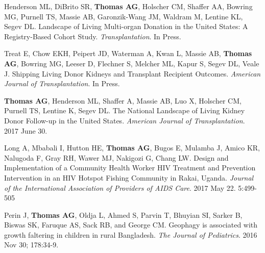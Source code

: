 \documentclass[10pt]{article}
\begin{document}
\begin{bibenum}


\item Henderson ML, DiBrito SR, \textbf{Thomas AG}, Holscher CM,
  Shaffer AA, Bowring MG, Purnell TS, Massie AB, Garonzik-Wang JM,
  Waldram M, Lentine KL, Segev DL.  Landscape of Living Multi-organ
  Donation in the United States: A Registry-Based Cohort Study.
  \emph{Transplantation}. In Press.

\item Treat E, Chow EKH, Peipert JD, Waterman A, Kwan L, Massie AB,
  \textbf{Thomas AG}, Bowring MG, Leeser D, Flechner S, Melcher ML, Kapur S,
  Segev DL, Veale J. Shipping Living Donor Kidneys and Transplant Recipient
  Outcomes.
  \emph{American Journal of Transplantation}. In Press.

\item \textbf{Thomas AG}, Henderson ML, Shaffer A, Massie AB, Luo X,
  Holscher CM, Purnell TS, Lentine K, Segev DL. The National Landscape
  of Living Kidney Donor Follow-up in the United States.
  \emph{American Journal of Transplantation}. 2017 June 30.

\item Long A, Mbabali I, Hutton HE, \textbf{Thomas AG}, Bugos E,
  Mulamba J, Amico KR, Nalugoda F, Gray RH,
  Wawer MJ, Nakigozi G, Chang LW.
  Design and Implementation of a Community Health Worker HIV
  Treatment and Prevention Intervention in an HIV Hotspot
  Fishing Community in Rakai, Uganda. \emph{Journal of the International
  Association of Providers of AIDS Care}. 2017 May 22. 5:499-505

\item Perin J, \textbf{Thomas AG}, Oldja L, Ahmed S, Parvin T,
  Bhuyian SI, Sarker B, Biswas SK, Faruque AS,
  Sack RB, and George CM. Geophagy is associated with growth
  faltering in children in rural Bangladesh.
  \emph{The Journal of Pediatrics}. 2016 Nov 30; 178:34-9.

\end{bibenum}
\end{document}
